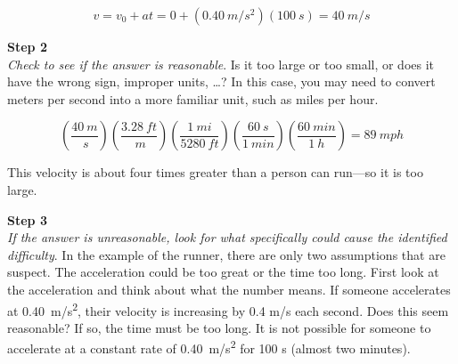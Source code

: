\documentclass[dvipsnames]{article}
\begin{document}
\begin{equation*}
    v = v_0 + at = 0 + \left(\SI{0.40}{m/s^2}\right) \left(\SI{100}{s}\right) = \SI{40}{m/s}
\end{equation*}

\textbf{Step 2}\\
\textit{Check to see if the answer is reasonable}. Is it too large or too small, or does it have the wrong sign, improper units, \ldots ? In this case, you may need to convert meters per second into a more familiar unit, such as miles per hour.

\begin{equation*}
    \left(\frac{\SI{40}{m}}{\SI{}{s}}\right)
    \left(\frac{\SI{3.28}{ft}}{\SI{}{m}}\right)
    \left(\frac{\SI{1}{mi}}{\SI{5280}{ft}}\right)
    \left(\frac{\SI{60}{s}}{\SI{1}{min}}\right)
    \left(\frac{\SI{60}{min}}{\SI{1}{h}}\right)
    = \SI{89}{mph}
\end{equation*}

This velocity is about four times greater than a person can run---so it is too large.

\vspace{1em}

\textbf{Step 3}\\
\textit{If the answer is unreasonable, look for what specifically could cause the identified difficulty}. In the example of the runner, there are only two assumptions that are suspect. The acceleration could be too great or the time too long. First look at the acceleration and think about what the number means. If someone accelerates at \SI{0.40}{m/s^2}, their velocity is increasing by 0.4 m/s each second. Does this seem reasonable? If so, the time must be too long. It is not possible for someone to accelerate at a constant rate of \SI{0.40}{m/s^2} for 100 s (almost two minutes).
 


 

 
\end{document}
